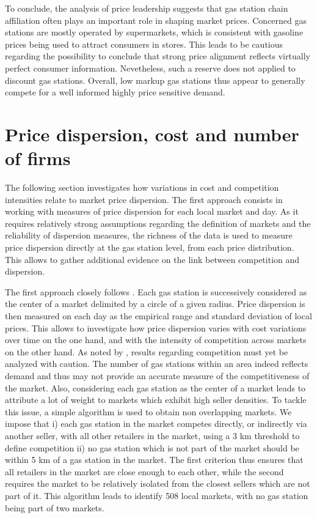 \documentclass[english]{article}
\begin{document}
To conclude, the analysis of price leadership suggests that gas station chain affiliation often plays an important role in shaping market prices. Concerned gas stations are mostly operated by supermarkets, which is consistent with gasoline prices being used to attract consumers in stores. This leads to be cautious regarding the possibility to conclude that strong price alignment reflects virtually perfect consumer information. Nevetheless, such a reserve does not applied to discount gas stations. Overall, low markup gas stations thus appear to generally compete for a well informed highly price sensitive demand.

\section{Price dispersion, cost and number of firms}
\label{sec:market_dispersion}

The following section investigates how variations in cost and competition intensities relate to market price dispersion. The first approach consists in working with measures of price dispersion for each local market and day. As it requires relatively strong assumptions regarding the definition of markets and the reliability of dispersion measures, the richness of the data is used to measure price dispersion directly at the gas station level, from each price distribution. This allows to gather additional evidence on the link between competition and dispersion.

The first approach closely follows \cite{CHA11}. Each gas station is successively considered as the center of a market delimited by a circle of a given radius. Price dispersion is then measured on each day as the empirical range and standard deviation of local prices. This allows to investigate how price dispersion varies with cost variations over time on the one hand, and with the intensity of competition across markets on the other hand. As noted by \cite{CHA11}, results regarding competition must yet be analyzed with caution. The number of gas stations within an area indeed reflects demand and thus may not provide an accurate measure of the competitiveness of the market. Also, considering each gas station as the center of a market leads to attribute a lot of weight to markets which exhibit high seller densities. To tackle this issue, a simple algorithm is used to obtain non overlapping markets. We impose that i) each gas station in the market competes directly, or indirectly via another seller, with all other retailers in the market, using a 3 km threshold to define competition ii) no gas station which is not part of the market should be within 5 km of a gas station in the market. The first criterion thus ensures that all retailers in the market are close enough to each other, while the second requires the market to be relatively isolated from the closest sellers which are not part of it. This algorithm leads to identify 508 local markets, with no gas station being part of two markets.
\end{document}
